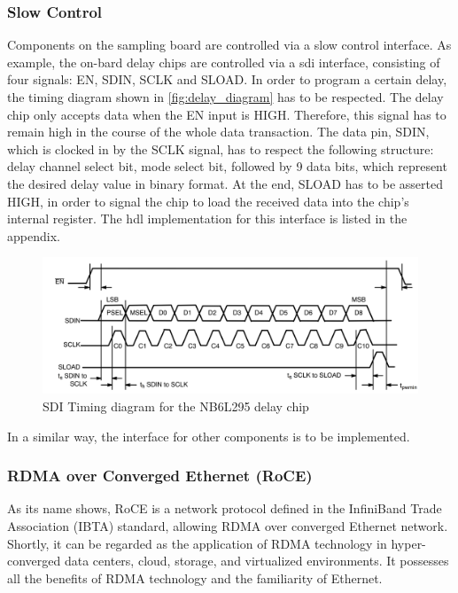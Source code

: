 \subsubsection*{Slow Control}
Components on the sampling board are controlled via a slow control interface. 
As example, the on-bard delay chips are controlled via a \gls{sdi} interface, consisting of four signals: EN, SDIN, SCLK and SLOAD. 
In order to program a certain delay, the timing diagram shown in \autoref{fig:delay_diagram} has to be respected.
The delay chip only accepts data when the EN input is HIGH. 
Therefore, this signal has to remain high in the course of the whole data transaction. 
The data pin, SDIN, which is clocked in by the SCLK signal, has to respect the following structure: delay channel select bit, mode select bit, followed by 9 data bits, which represent the desired delay value in binary format.
At the end, SLOAD has to be asserted HIGH, in order to signal the chip to load the received data into the chip's internal register.
The \gls{hdl} implementation for this interface is listed in the appendix.
\begin{figure}[tbh]
	\centering
	\includegraphics[width = \textwidth]{chap/04-work/img/sdi_interface_delay}
	\caption{SDI Timing diagram for the NB6L295 delay chip \cite{NB6L295}}
	\label{fig:delay_diagram}
\end{figure}
In a similar way, the interface for other components is to be implemented.

\subsubsection*{RDMA over Converged Ethernet (RoCE)}
As its name shows, RoCE is a network protocol defined in the InfiniBand Trade Association (IBTA) standard, allowing RDMA over converged Ethernet network. Shortly, it can be regarded as the application of RDMA technology in hyper-converged data centers, cloud, storage, and virtualized environments. 
It possesses all the benefits of RDMA technology and the familiarity of Ethernet.

